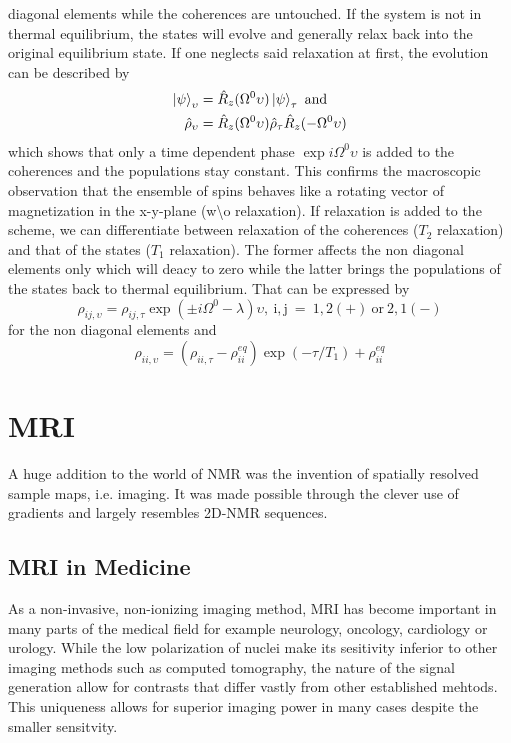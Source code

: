         diagonal elements while the coherences are untouched.
        If the system is not in thermal equilibrium, the states will evolve and generally relax back
        into the original equilibrium state. If one neglects said relaxation at first, the evolution
        can be described by 
        \begin{equation}
            \begin{split}
                \ket\psi_\upsilon &= \hat R_z(\Omega^0\upsilon)\ket\psi_\tau ~ \mathrm{and} \\
                \hat\rho_\upsilon &= \hat R_z(\Omega^0\upsilon)\hat\rho_\tau\hat
                R_z(-\Omega^0\upsilon)
            \end{split}
        \end{equation}
        which shows that only a time dependent phase $\exp{i\Omega^0 \upsilon}$ is added to the coherences and the populations
        stay constant. This confirms the macroscopic observation that the ensemble of spins behaves like a rotating vector of
        magnetization in the x-y-plane (w\textbackslash o relaxation).
        If relaxation is added to the scheme, we can differentiate between relaxation of the
        coherences ($T_2$ relaxation) and that of the states ($T_1$ relaxation). The former affects
        the non diagonal elements only which will deacy to zero while the latter brings the populations of the states back to
        thermal equilibrium. That can be expressed by
        \begin{equation}
            \rho_{ij, \upsilon} = \rho_{ij, \tau} \exp{(\pm
                i\Omega^0-\lambda)\upsilon},~\mathrm{i,j~=~
            1,2(+)~or~2,1(-)}
        \end{equation}
        for the non diagonal elements and
        \begin{equation}
            \rho_{ii,\upsilon} = (\rho_{ii,\tau} - \rho_{ii}^{eq})\exp(-\tau/T_1)+\rho_{ii}^{eq}
        \end{equation}

    \section{MRI}
        A huge addition to the world of NMR was the invention of spatially resolved sample maps,
        i.e. imaging. It was made possible through the clever use of gradients and largely resembles
        2D-NMR sequences.
        \subsection{MRI in Medicine}
            As a non-invasive, non-ionizing imaging method, MRI has become important in many parts
            of the medical field for example neurology, oncology, cardiology or urology. While the
            low polarization of nuclei make its sesitivity inferior to other imaging methods such as
            computed tomography, the nature of the signal generation allow for contrasts that differ
            vastly from other established mehtods. This uniqueness allows for superior imaging power
            in many cases despite the smaller sensitvity.
